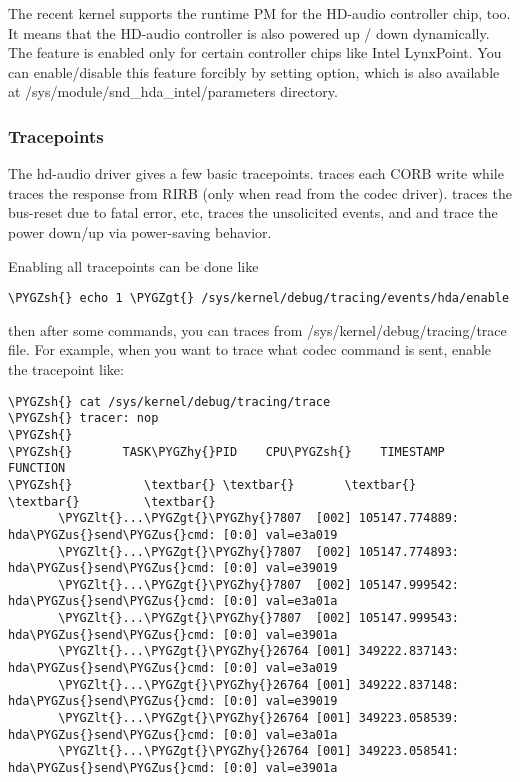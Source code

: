 \documentclass[a4paper,8pt,english]{sphinxmanual}
\def\PYGZus{\char`\_}
\def\PYGZlt{\char`\<}
\def\PYGZgt{\char`\>}
\def\PYGZsh{\char`\#}
\def\PYGZhy{\char`\-}
\begin{document}
The recent kernel supports the runtime PM for the HD-audio controller
chip, too.  It means that the HD-audio controller is also powered up /
down dynamically.  The feature is enabled only for certain controller
chips like Intel LynxPoint.  You can enable/disable this feature
forcibly by setting  option, which is also
available at /sys/module/snd\_hda\_intel/parameters directory.


\subsubsection{Tracepoints}
\label{sound/hd-audio/notes:tracepoints}
The hd-audio driver gives a few basic tracepoints.
 traces each CORB write while 
traces the response from RIRB (only when read from the codec driver).
 traces the bus-reset due to fatal error, etc,
 traces the unsolicited events, and
 and  trace the power down/up
via power-saving behavior.

Enabling all tracepoints can be done like

\begin{Verbatim}[commandchars=\\\{\}]
\PYGZsh{} echo 1 \PYGZgt{} /sys/kernel/debug/tracing/events/hda/enable
\end{Verbatim}

then after some commands, you can traces from
/sys/kernel/debug/tracing/trace file.  For example, when you want to
trace what codec command is sent, enable the tracepoint like:

\begin{Verbatim}[commandchars=\\\{\}]
\PYGZsh{} cat /sys/kernel/debug/tracing/trace
\PYGZsh{} tracer: nop
\PYGZsh{}
\PYGZsh{}       TASK\PYGZhy{}PID    CPU\PYGZsh{}    TIMESTAMP  FUNCTION
\PYGZsh{}          \textbar{} \textbar{}       \textbar{}          \textbar{}         \textbar{}
       \PYGZlt{}...\PYGZgt{}\PYGZhy{}7807  [002] 105147.774889: hda\PYGZus{}send\PYGZus{}cmd: [0:0] val=e3a019
       \PYGZlt{}...\PYGZgt{}\PYGZhy{}7807  [002] 105147.774893: hda\PYGZus{}send\PYGZus{}cmd: [0:0] val=e39019
       \PYGZlt{}...\PYGZgt{}\PYGZhy{}7807  [002] 105147.999542: hda\PYGZus{}send\PYGZus{}cmd: [0:0] val=e3a01a
       \PYGZlt{}...\PYGZgt{}\PYGZhy{}7807  [002] 105147.999543: hda\PYGZus{}send\PYGZus{}cmd: [0:0] val=e3901a
       \PYGZlt{}...\PYGZgt{}\PYGZhy{}26764 [001] 349222.837143: hda\PYGZus{}send\PYGZus{}cmd: [0:0] val=e3a019
       \PYGZlt{}...\PYGZgt{}\PYGZhy{}26764 [001] 349222.837148: hda\PYGZus{}send\PYGZus{}cmd: [0:0] val=e39019
       \PYGZlt{}...\PYGZgt{}\PYGZhy{}26764 [001] 349223.058539: hda\PYGZus{}send\PYGZus{}cmd: [0:0] val=e3a01a
       \PYGZlt{}...\PYGZgt{}\PYGZhy{}26764 [001] 349223.058541: hda\PYGZus{}send\PYGZus{}cmd: [0:0] val=e3901a
\end{Verbatim}
\end{document}
